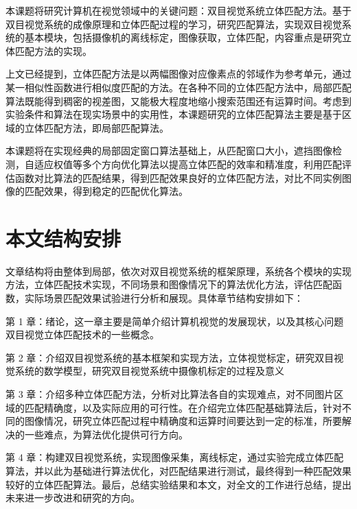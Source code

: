 本课题将研究计算机在视觉领域中的关键问题：双目视觉系统立体匹配方法。基于双目视觉系统的成像原理和立体匹配过程的学习，研究匹配算法，实现双目视觉系统的基本模块，包括摄像机的离线标定，图像获取，立体匹配，内容重点是研究立体匹配方法的实现。

上文已经提到，立体匹配方法是以两幅图像对应像素点的邻域作为参考单元，通过某一相似性函数进行相似度匹配的方法。在各种不同的立体匹配方法中，局部匹配算法既能得到稠密的视差图，又能极大程度地缩小搜索范围还有运算时间。考虑到实验条件和算法在现实场景中的实用性，本课题研究的立体匹配算法主要是基于区域的立体匹配方法，即局部匹配算法。

本课题将在实现经典的局部固定窗口算法基础上，从匹配窗口大小，遮挡图像检测，自适应权值等多个方向优化算法以提高立体匹配的效率和精准度，利用匹配评估函数对比算法的匹配结果，得到匹配效果良好的立体匹配方法，对比不同实例图像的匹配效果，得到稳定的匹配优化算法。

\section{本文结构安排}

文章结构将由整体到局部，依次对双目视觉系统的框架原理，系统各个模块的实现方法，立体匹配技术实现，不同场景和图像情况下的算法优化方法，评估匹配函数，实际场景匹配效果试验进行分析和展现。具体章节结构安排如下：

第 1 章：绪论，这一章主要是简单介绍计算机视觉的发展现状，以及其核心问题双目视觉立体匹配技术的一些概念。 

第 2 章：介绍双目视觉系统的基本框架和实现方法，立体视觉标定，研究双目视觉系统的数学模型，研究双目视觉系统中摄像机标定的过程及意义

第 3 章：介绍多种立体匹配方法，分析对比算法各自的实现难点，对不同图片区域的匹配精确度，以及实际应用的可行性。在介绍完立体匹配基础算法后，针对不同的图像情况，研究立体匹配过程中精确度和运算时间要达到一定的标准，所要解决的一些难点，为算法优化提供可行方向。

第 4 章：构建双目视觉系统，实现图像采集，离线标定，通过实验完成立体匹配算法，并以此为基础进行算法优化，对匹配结果进行测试，最终得到一种匹配效果较好的立体匹配算法。最后，总结实验结果和本文，对全文的工作进行总结，提出未来进一步改进和研究的方向。 



